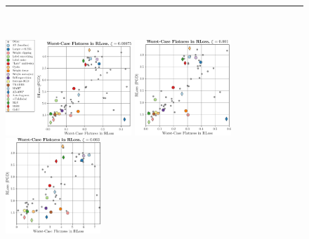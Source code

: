 \begin{figure}[t]
	{\color{black!75}\rule{\textwidth}{0.65px}}
	\\[-6px]
	
	\begin{minipage}[t]{0.3\textwidth}
		\vspace*{0px}
		
		\includegraphics[height=3.6cm]{plots_supp_flatness_correlation_joint_loss_e000075}
	\end{minipage}
	\begin{minipage}[t]{0.22\textwidth}
		\vspace*{0px}
		
		\includegraphics[height=3.6cm]{plots_supp_flatness_correlation_joint_loss_e0001}
	\end{minipage}
	\begin{minipage}[t]{0.22\textwidth}
		\vspace*{0px}
		
		\includegraphics[height=3.6cm]{plots_supp_flatness_correlation_joint_loss_e0003}
	\end{minipage}
	\begin{minipage}[t]{0.22\textwidth}
		\vspace*{0px}
		

\end{minipage}
\end{figure}
